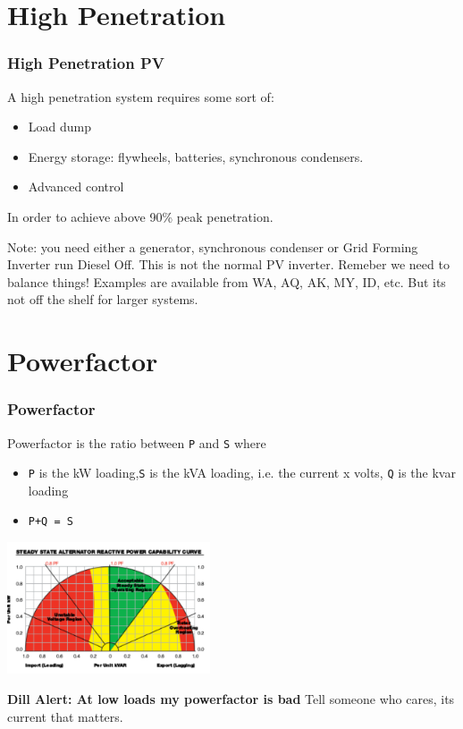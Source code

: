 \documentclass{beamer}
\def\dill#1{\textcolor{RawSienna}{\textbf{Dill Alert: #1}}}
\begin{document}
\section{High Penetration}
\begin{frame}\frametitle{High Penetration PV}
A high penetration system requires some sort of:

\begin{itemize}
\item Load dump
\item Energy storage: flywheels, batteries, synchronous condensers.
\item Advanced control
\end{itemize}

In order to achieve above 90\% peak penetration.
\pause

Note: you need either a generator, synchronous condenser or
Grid Forming Inverter run Diesel Off. This is not the normal 
PV inverter. Remeber we need to balance things!
\pause 
\vfill
Examples are available from WA, AQ, AK, MY, ID, etc.
\vfill
But its not off the shelf for larger systems.
\end{frame}

\section{Powerfactor}
\begin{frame}\frametitle{Powerfactor}
Powerfactor is the ratio between \texttt{P} and \texttt{S} where
\begin{itemize}
\item \texttt{P} is the kW loading,\texttt{S} is the kVA loading,
  i.e. the current x volts, \texttt{Q} is the kvar loading 
\item \texttt{P+Q = S}
\end{itemize}
\includegraphics[width=6cm]{pf.pdf}

\dill{At low loads my powerfactor is bad}
\pause Tell someone who cares, its current that matters.
\end{frame}
\end{document}
